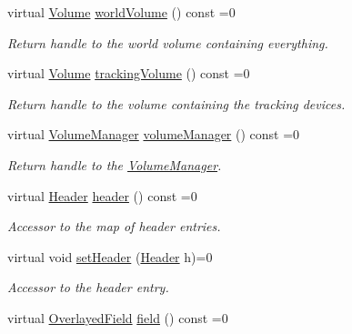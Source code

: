\begin{DoxyCompactItemize}
virtual \hyperlink{class_d_d4hep_1_1_geometry_1_1_volume}{Volume} \hyperlink{class_d_d4hep_1_1_geometry_1_1_l_c_d_d_aa7d089039516ff312cf95168288019fe}{worldVolume} () const =0
\begin{DoxyCompactList}\small\item\em Return handle to the world volume containing everything. \item\end{DoxyCompactList}\item 
virtual \hyperlink{class_d_d4hep_1_1_geometry_1_1_volume}{Volume} \hyperlink{class_d_d4hep_1_1_geometry_1_1_l_c_d_d_a351b289056485f960e9121382018c92b}{trackingVolume} () const =0
\begin{DoxyCompactList}\small\item\em Return handle to the volume containing the tracking devices. \item\end{DoxyCompactList}\item 
virtual \hyperlink{class_d_d4hep_1_1_geometry_1_1_volume_manager}{VolumeManager} \hyperlink{class_d_d4hep_1_1_geometry_1_1_l_c_d_d_a2112b2267f5f07ecc94e909d696ffdbd}{volumeManager} () const =0
\begin{DoxyCompactList}\small\item\em Return handle to the \hyperlink{class_d_d4hep_1_1_geometry_1_1_volume_manager}{VolumeManager}. \item\end{DoxyCompactList}\item 
virtual \hyperlink{class_d_d4hep_1_1_geometry_1_1_header}{Header} \hyperlink{class_d_d4hep_1_1_geometry_1_1_l_c_d_d_ad09f49fc86a5b286ae55901e2b169d7c}{header} () const =0
\begin{DoxyCompactList}\small\item\em Accessor to the map of header entries. \item\end{DoxyCompactList}\item 
virtual void \hyperlink{class_d_d4hep_1_1_geometry_1_1_l_c_d_d_a9927ac6aeae1dad18e22413deba9aa65}{setHeader} (\hyperlink{class_d_d4hep_1_1_geometry_1_1_header}{Header} h)=0
\begin{DoxyCompactList}\small\item\em Accessor to the header entry. \item\end{DoxyCompactList}\item 
virtual \hyperlink{class_d_d4hep_1_1_geometry_1_1_overlayed_field}{OverlayedField} \hyperlink{class_d_d4hep_1_1_geometry_1_1_l_c_d_d_a62750fbd02e0f4e06c570d00dc9eb2ca}{field} () const =0

\end{DoxyCompactItemize}
